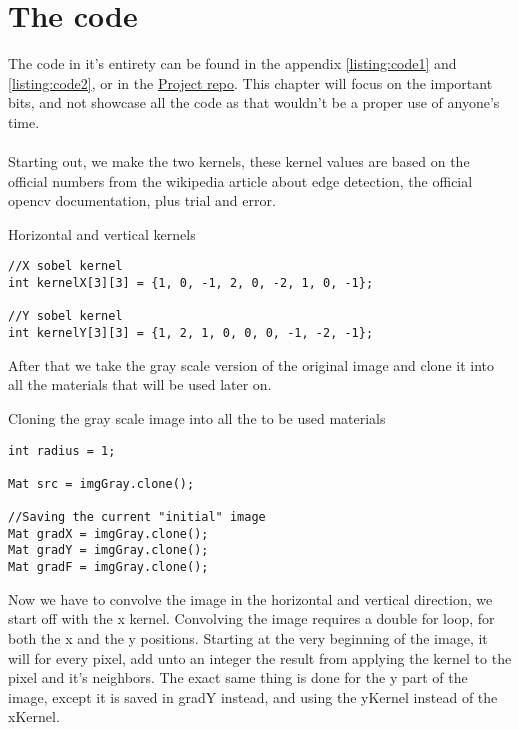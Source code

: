 \chapter{The code}
	The code in it's entirety can be found in the appendix \autoref{listing:code1} and \autoref{listing:code2}, or in the \href{https://github.com/totalfreak/opencvFilters}{\color{blue}Project repo}. This chapter will focus on the important bits, and not showcase all the code as that wouldn't be a proper use of anyone's time.\\
	\\
	Starting out, we make the two kernels, these kernel values are based on the official numbers from the wikipedia article about edge detection, the official opencv documentation, plus trial and error.

    \begin{listing}[H]
    	\caption{Horizontal and vertical kernels}
    	\label{listing:kernels}
    	\begin{verbatim}
//X sobel kernel
int kernelX[3][3] = {1, 0, -1, 2, 0, -2, 1, 0, -1};

//Y sobel kernel
int kernelY[3][3] = {1, 2, 1, 0, 0, 0, -1, -2, -1};
    	\end{verbatim}
    \end{listing}
	After that we take the gray scale version of the original image and clone it into all the materials that will be used later on. 
\begin{listing}[H]
	\caption{Cloning the gray scale image into all the to be used materials}
	\label{listing:matClone}
	\begin{verbatim}
int radius = 1;

Mat src = imgGray.clone();

//Saving the current "initial" image
Mat gradX = imgGray.clone();
Mat gradY = imgGray.clone();
Mat gradF = imgGray.clone();
	\end{verbatim}
\end{listing}\newpage
Now we have to convolve the image in the horizontal and vertical direction, we start off with the x kernel. Convolving the image requires a double for loop, for both the x and the y positions. Starting at the very beginning of the image, it will for every pixel, add unto an integer the result from applying the kernel to the pixel and it's neighbors. The exact same thing is done for the y part of the image, except it is saved in gradY instead, and using the yKernel instead of the xKernel.
